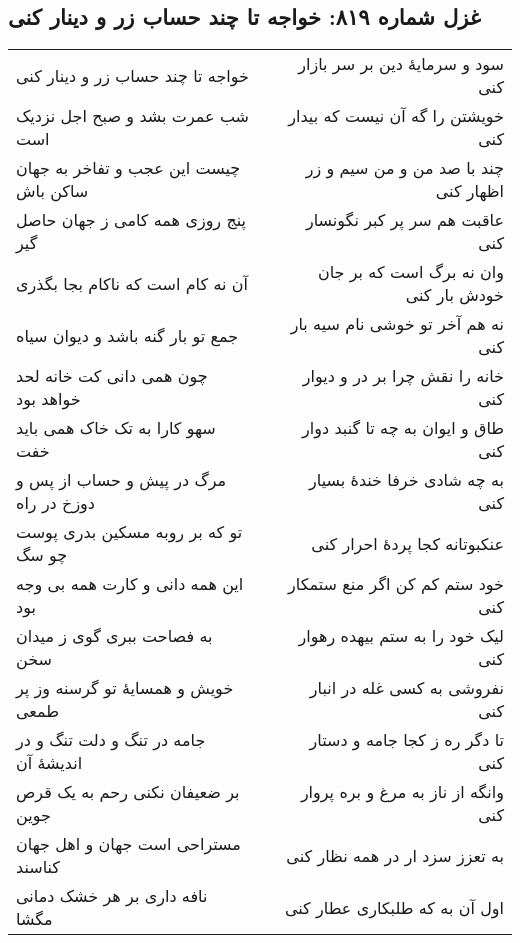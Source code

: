 \begin{center}
\section*{غزل شماره ۸۱۹: خواجه تا چند حساب زر و دینار کنی}
\label{sec:819}
\begin{longtable}{l p{0.5cm} r}
خواجه تا چند حساب زر و دینار کنی
&&
سود و سرمایهٔ دین بر سر بازار کنی
\\
شب عمرت بشد و صبح اجل نزدیک است
&&
خویشتن را گه آن نیست که بیدار کنی
\\
چیست این عجب و تفاخر به جهان ساکن باش
&&
چند با صد من و من سیم و زر اظهار کنی
\\
پنج روزی همه کامی ز جهان حاصل گیر
&&
عاقبت هم سر پر کبر نگونسار کنی
\\
آن نه کام است که ناکام بجا بگذری
&&
وان نه برگ است که بر جان خودش بار کنی
\\
جمع تو بار گنه باشد و دیوان سیاه
&&
نه هم آخر تو خوشی نام سیه بار کنی
\\
چون همی دانی کت خانه لحد خواهد بود
&&
خانه را نقش چرا بر در و دیوار کنی
\\
سهو کارا به تک خاک همی باید خفت
&&
طاق و ایوان به چه تا گنبد دوار کنی
\\
مرگ در پیش و حساب از پس و دوزخ در راه
&&
به چه شادی خرفا خندهٔ بسیار کنی
\\
تو که بر روبه مسکین بدری پوست چو سگ
&&
عنکبوتانه کجا پردهٔ احرار کنی
\\
این همه دانی و کارت همه بی وجه بود
&&
خود ستم کم کن اگر منع ستمکار کنی
\\
به فصاحت ببری گوی ز میدان سخن
&&
لیک خود را به ستم بیهده رهوار کنی
\\
خویش و همسایهٔ تو گرسنه وز پر طمعی
&&
نفروشی به کسی غله در انبار کنی
\\
جامه در تنگ و دلت تنگ و در اندیشهٔ آن
&&
تا دگر ره ز کجا جامه و دستار کنی
\\
بر ضعیفان نکنی رحم به یک قرص جوین
&&
وانگه از ناز به مرغ و بره پروار کنی
\\
مستراحی است جهان و اهل جهان کناسند
&&
به تعزز سزد ار در همه نظار کنی
\\
نافه داری بر هر خشک دمانی مگشا
&&
اول آن به که طلبکاری عطار کنی
\\
\end{longtable}
\end{center}
